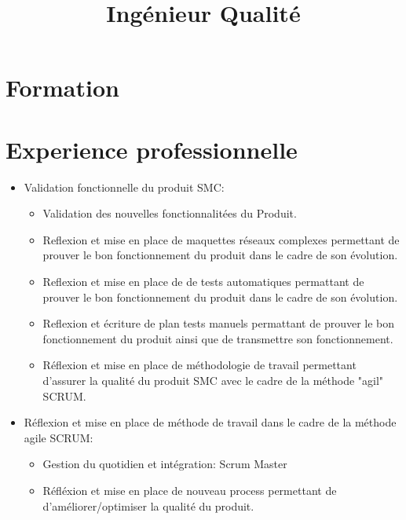 \documentclass[11pt,a4paper,sans]{moderncv}
\title{Ingénieur Qualité}
\begin{document}
\makecvtitle
\section{Formation}
\section{Experience professionnelle}
	{%
		\begin{itemize}%
		\item Validation fonctionnelle du produit SMC:
			\begin{itemize}%
			\item Validation des nouvelles fonctionnalitées du Produit.
			\item Reflexion et mise en place de maquettes réseaux complexes permettant de prouver le bon fonctionnement du produit dans le cadre de son évolution.
			\item Reflexion et mise en place de de tests automatiques permattant de prouver le bon fonctionnement du produit dans le cadre de son évolution.
			\item Reflexion et écriture de plan tests manuels permattant de prouver le bon fonctionnement du produit ainsi que de transmettre son fonctionnement.
			\item Réflexion et mise en place de méthodologie de travail permettant d'assurer la qualité du produit SMC avec le cadre de la méthode "agil" SCRUM.
			\end{itemize}
		\end{itemize}
		\begin{itemize}%
		\item Réflexion et mise en place de méthode de travail dans le cadre de la méthode agile SCRUM:
			\begin{itemize}%
			\item Gestion du quotidien et intégration: Scrum Master
			\item Réfléxion et mise en place de nouveau process permettant de d'améliorer/optimiser la qualité du produit.
			\end{itemize}
		\end{itemize}
	}
\end{document}
